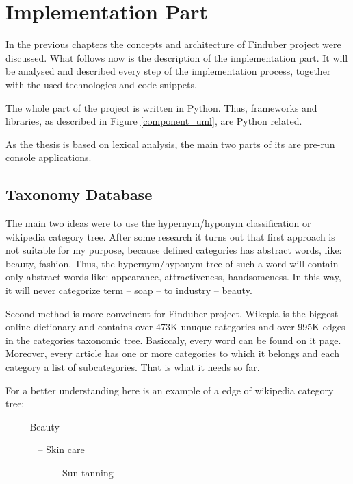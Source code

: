 
\section{Implementation Part}

\setcounter{page}{39}
In the previous chapters the concepts and architecture of Finduber project were discussed. What follows now is the description of the implementation part. It will be analysed and described every step of the implementation process, together with the used technologies and code snippets. 

The whole part of the project is written in Python. Thus, frameworks and libraries, as described in Figure \ref{component_uml}, are Python related.

As the thesis is based on lexical analysis, the main two parts of its are pre-run console applications.

\subsection{Taxonomy Database}

The main two ideas were to use the hypernym/hyponym classification or wikipedia category tree. After some research it turns out that first approach is not suitable for my purpose, because defined categories has abstract words, like: beauty, fashion. Thus, the hypernym/hyponym tree of such a word will contain only abstract words like: appearance, attractiveness, handsomeness. In this way, it will never categorize term -- soap -- to industry -- beauty. 

Second method is more conveinent for Finduber project. Wikepia is the biggest online dictionary and contains over 473K unuque categories and over 995K edges in the categories taxonomic tree. Basiccaly, every word can be found on it page. Moreover, every article has one or more categories to which it belongs and each category a list of subcategories. That is what it needs so far. 

For a better understanding here is an example of a edge of wikipedia category tree:

\begin{enumerate}
\item[--] Beauty
\begin{enumerate}
\item[--] Skin care
\begin{enumerate}
\item[--] Sun tanning
\end{enumerate}
\end{enumerate}
\end{enumerate}

